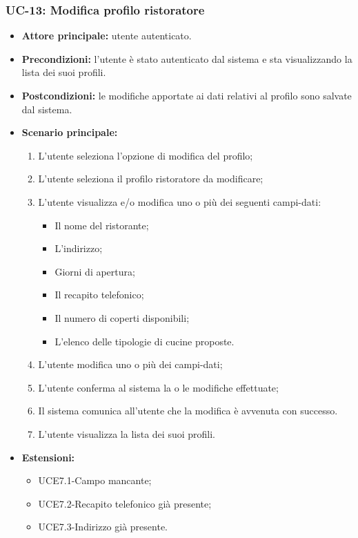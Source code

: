 \subsubsection{UC-13: Modifica profilo ristoratore}
\begin{itemize}
\item \textbf{Attore principale:} utente autenticato.
\item \textbf{Precondizioni:} l'utente è stato autenticato dal sistema e sta visualizzando la lista dei suoi profili.
\item \textbf{Postcondizioni:} le modifiche apportate ai dati relativi al profilo sono salvate dal sistema.
\item \textbf{Scenario principale:}
\begin{enumerate}
    \item L'utente seleziona l'opzione di modifica del profilo;
    \item L'utente seleziona il profilo ristoratore da modificare;
    \item L'utente visualizza e/o modifica uno o più dei seguenti campi-dati:
        \begin{itemize}
            \item Il nome del ristorante;
            \item L'indirizzo;
            \item Giorni di apertura;
            \item Il recapito telefonico;
            \item Il numero di coperti disponibili;
            \item L'elenco delle tipologie di cucine proposte.
        \end{itemize}
    \item L'utente modifica uno o più dei campi-dati;
    \item L'utente conferma al sistema la o le modifiche effettuate;
    \item Il sistema comunica all'utente che la modifica è avvenuta con successo.
    \item L'utente visualizza la lista dei suoi profili.
\end{enumerate}
        \item \textbf{Estensioni:}
        \begin{itemize}
                \item UCE7.1-Campo mancante;
                \item UCE7.2-Recapito telefonico già presente;
                \item UCE7.3-Indirizzo già presente.
        \end{itemize}
\end{itemize}

